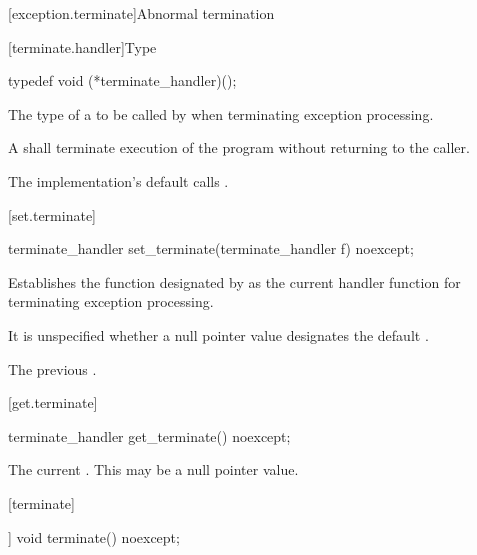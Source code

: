 [exception.terminate]{Abnormal termination}

[terminate.handler]{Type }

%
\begin{itemdecl}
typedef void (*terminate_handler)();
\end{itemdecl}

\begin{itemdescr}
\pnum
The type of a
to be called by
%
when terminating exception processing.

\pnum
\required
A  shall
terminate execution of the program without returning to the caller.

\pnum
{}
The implementation's default  calls
.%
\end{itemdescr}

[set.terminate]{}

%
\begin{itemdecl}
terminate_handler set_terminate(terminate_handler f) noexcept;
\end{itemdecl}

\begin{itemdescr}
\pnum
\effects
Establishes the function designated by  as the current
handler function for terminating exception processing.

\pnum
\remarks It is unspecified whether a null pointer value designates the default
.

\pnum
\returns
The previous .
\end{itemdescr}

[get.terminate]{}

\begin{itemdecl}
terminate_handler get_terminate() noexcept;
\end{itemdecl}

\begin{itemdescr}
\pnum
\returns The current .
\enternote This may be a null pointer value. \exitnote
\end{itemdescr}

[terminate]{}

%
\begin{itemdecl}
[[noreturn]] void terminate() noexcept;
\end{itemdecl}

